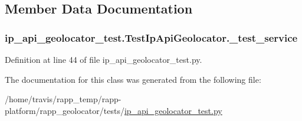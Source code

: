 \subsection{Member Data Documentation}
\hypertarget{classip__api__geolocator__test_1_1TestIpApiGeolocator_a7c679d77e9aef655c1f1b20c86fa761c}{
\subsubsection[{\-\_\-test\-\_\-service}]{\setlength{\rightskip}{0pt plus 5cm}ip\-\_\-api\-\_\-geolocator\-\_\-test.\-Test\-Ip\-Api\-Geolocator.\-\_\-test\-\_\-service\hspace{0.3cm}{\ttfamily [private]}}}\label{classip__api__geolocator__test_1_1TestIpApiGeolocator_a7c679d77e9aef655c1f1b20c86fa761c}


Definition at line 44 of file ip\-\_\-api\-\_\-geolocator\-\_\-test.\-py.



The documentation for this class was generated from the following file\-:\begin{DoxyCompactItemize}
\item 
/home/travis/rapp\-\_\-temp/rapp-\/platform/rapp\-\_\-geolocator/tests/\hyperlink{ip__api__geolocator__test_8py}{ip\-\_\-api\-\_\-geolocator\-\_\-test.\-py}\end{DoxyCompactItemize}
